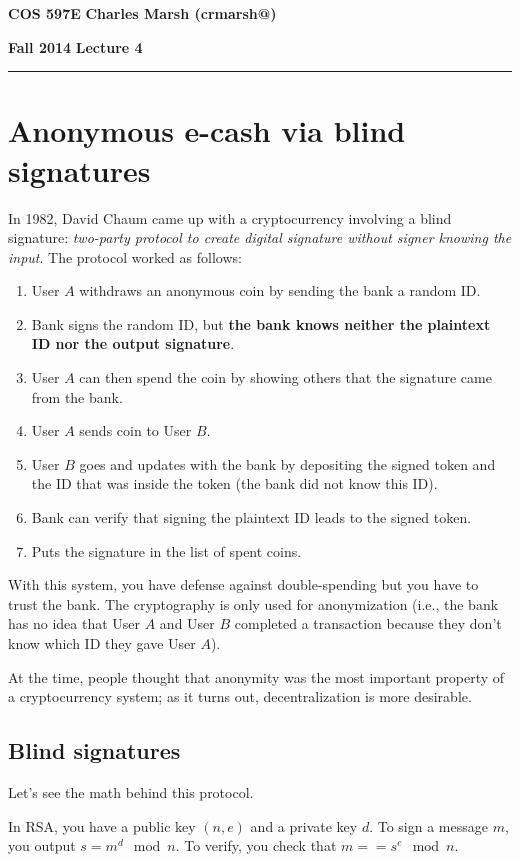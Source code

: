 \documentclass[12pt]{article}
\makeatletter
\newcommand{\myheader}[4]
{\vspace*{-0.5in}
\noindent
{#1} \hfill {#3}

\noindent
{#2} \hfill {#4}

\noindent
\rule[8pt]{\textwidth}{1pt}

\vspace{1ex} 
}  %
\newcommand{\myalgsheader}[0]
{\myheader
{ {\bf{COS 597E}} }
{ {\bf{Fall 2014}} }
{ {\bf{Charles Marsh (crmarsh@)}} }
{ {\bf{Lecture 4}} }
}
\makeatother
\begin{document}
\myalgsheader

\pagestyle{plain}

\section*{Anonymous e-cash via blind signatures}

In 1982, David Chaum came up with a cryptocurrency involving a blind signature: \textit{two-party protocol to create digital signature without signer knowing the input}. The protocol worked as follows:

\begin{enumerate}
\item User $A$ withdraws an anonymous coin by sending the bank a random ID.
\item Bank signs the random ID, but \textbf{the bank knows neither the plaintext ID nor the output signature}.
\item User $A$ can then spend the coin by showing others that the signature came from the bank.
\item User $A$ sends coin to User $B$.
\item User $B$ goes and updates with the bank by depositing the signed token and the ID that was inside the token (the bank did not know this ID).
\item Bank can verify that signing the plaintext ID leads to the signed token.
\item Puts the signature in the list of spent coins.
\end{enumerate}

With this system, you have defense against double-spending but you have to trust the bank. The cryptography is only used for anonymization (i.e., the bank has no idea that User $A$ and User $B$ completed a transaction because they don't know which ID they gave User $A$).

At the time, people thought that anonymity was the most important property of a cryptocurrency system; as it turns out, decentralization is more desirable.

\subsection*{Blind signatures}

Let's see the math behind this protocol.

In RSA, you have a public key $(n, e)$ and a private key $d$. To sign a message $m$, you output $s = m^d \mod n$. To verify, you check that $m == s^e \mod n$.
\end{document}
